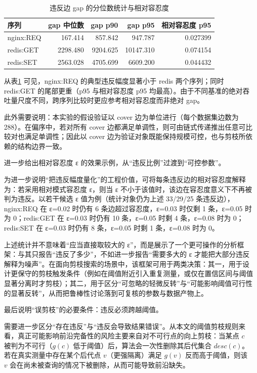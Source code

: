 \documentclass[UTF8,a4paper,12pt]{ctexart}
\numberwithin{equation}{section}
\begin{document}
\begin{table}[htbp]
\centering
\small
\setlength{\tabcolsep}{4pt}
\begin{tabular}{lrrrr}
\toprule
序列 & gap 中位数 & gap p90 & gap p95 & 相对容忍度 p95 \\
\midrule
nginx:REQ & 167.414 & 857.842 & 947.787 & 0.027399 \\
redis:GET & 2298.480 & 9204.625 & 10147.310 & 0.074154 \\
redis:SET & 2563.028 & 4705.699 & 6609.200 & 0.044432 \\
\bottomrule
\end{tabular}
\caption{违反边 gap 的分位数统计与相对容忍度}
\label{tab:gap-quantile-tail}
\end{table}

从表\ref{tab:gap-quantile-tail} 可见，nginx:REQ 的典型违反幅度显著小于 redis 两个序列；同时 redis:GET 的尾部更重（p95 与相对容忍度 p95 均最高）。由于不同基准的绝对吞吐量尺度不同，跨序列比较时更应参考相对容忍度而非绝对 gap。

此外需要说明：本实验的假设验证以 cover 边为单位进行（每个数据集边数为
288）。在偏序中，若对所有 cover
边都满足单调性，则可由链式传递推出任意可比较对也满足单调性；因此以 cover
边为验证对象既能保持规模可控，也与剪枝所依赖的结构边界一致。

进一步给出相对容忍度 ε 的效果示例，从``违反比例''过渡到``可控参数''。

为进一步说明``把违反幅度量化''的工程价值，可将每条违反边的相对容忍度解释为：若采用相对模式容忍度
ε，则当 ε 不小于该值时，该边在容忍度意义下不再被判为违反。以若干候选 ε
值为例（统计对象仍为上述 33/29/25 条违反边），nginx:REQ 在 ε=0.02 时仍有
6 条边超过容忍度，ε=0.03 时仅剩 1 条，ε=0.05 时为 0；redis:GET 在 ε=0.03
时仍有 10 条，ε=0.05 时剩 4 条，ε=0.08 时为 0；redis:SET 在 ε=0.03
时仍有 8 条，ε=0.05 时剩 1 条，ε=0.08 时为 0。

上述统计并不意味着``应当直接取较大的
ε''，而是展示了一个更可操作的分析框架：与其只报告``违反了多少''，不如进一步报告``需要多大的
ε
才能把大部分违反解释为噪声''。在面向剪枝搜索的场景中，该框架可用于两类决策：其一，用于设计更保守的剪枝触发条件（例如在阈值附近引入重复测量，或仅在置信区间与阈值显著分离时才剪枝）；其二，用于区分``可忽略的轻微反转''与``可能影响阈值可行性的显著反转''，从而把鲁棒性讨论落到可复核的参数与数据产物上。

最后说明``误剪枝''的必要条件：违反必须跨越阈值。

需要进一步区分``存在违反''与``违反会导致结果错误''。从本文的阈值剪枝规则来看，真正可能影响前沿完备性的风险主要来自对不可行点的向上剪枝：当某点
\(c\) 被判为不可行（\(g(c)\) 低于阈值）后，算法会一次性删除其后代集合
\(desc(c)\)。若在真实测量中存在某个后代点 \(v\)（更强隔离）满足 \(g(v)\)
反而高于阈值，则该 \(v\)
会在尚未被查询的情况下被删除，从而可能导致前沿缺失。
\end{document}
